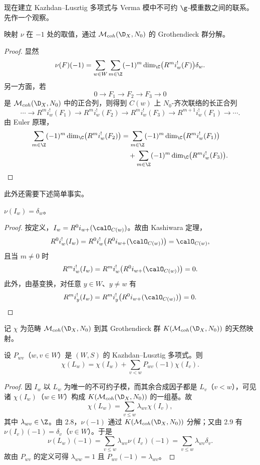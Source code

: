 现在建立 Kazhdan--Lusztig 多项式与 Verma 模中不可约 $\g$-模重数之间的联系。先作一个观察。

\begin{lemma}\label{lem:05.2.8}
映射 $\nu$ 在 $-1$ 处的取值，通过 $\mathcal{M}_{coh}(\D_X,N_0)$ 的 Grothendieck 群分解。
\end{lemma}

\begin{proof}
显然
$$\nu(F)(-1)=\sum_{w\in W}\sum_{m\in\Z}(-1)^m\dim_\C\bigl(R^mi^!_w(F)\bigr)\delta_w.$$
另一方面，若
$$0\longrightarrow F_1\longrightarrow F_2\longrightarrow F_3\longrightarrow 0$$
是 $\mathcal{M}_{coh}(\D_X,N_0)$ 中的正合列，则得到 $C(w)$ 上 $N_0$-齐次联络的长正合列
$$\cdots\to R^mi^!_w(F_1)\to R^mi^!_w(F_2)\to R^mi^!_w(F_3)\to R^{m+1}i^!_w(F_1)\to\cdots.$$
由 Euler 原理，
\begin{align*}
\sum_{m\in\Z}(-1)^m\dim_\C\bigl(R^mi^!_w(F_2)\bigr)
&=\sum_{m\in\Z}(-1)^m\dim_\C\bigl(R^mi^!_w(F_1)\bigr)\\
&\quad+\sum_{m\in\Z}(-1)^m\dim_\C\bigl(R^mi^!_w(F_3)\bigr).
\end{align*}
\end{proof}

此外还需要下述简单事实。

\begin{lemma}\label{lem:05.2.9}
$\nu(I_w)=\delta_w$。
\end{lemma}

\begin{proof}
按定义，$I_w=R^0i_{w+}(\calO_{C(w)})$。故由 Kashiwara 定理，
$$R^0i^!_w(I_w)=R^0i^!_w\bigl(R^0i_{w+}(\calO_{C(w)})\bigr)=\calO_{C(w)},$$
且当 $m\neq 0$ 时
$$R^mi^!_w(I_w)=R^mi^!_w\bigl(R^0i_{w+}(\calO_{C(w)})\bigr)=0.$$
此外，由基变换，对任意 $y\in W$、$y\neq w$ 有
$$R^mi^!_y(I_w)=R^mi^!_y\bigl(R^0i_{w+}(\calO_{C(w)})\bigr)=0.$$
\end{proof}

记 $\chi$ 为范畴 $\mathcal{M}_{coh}(\D_X,N_0)$ 到其 Grothendieck 群 $K(\mathcal{M}_{coh}(\D_X,N_0))$ 的天然映射。

\begin{theorem}\label{thm:05.2.10}
设 $P_{wv}$（$w,v\in W$）是 $(W,S)$ 的 Kazhdan--Lusztig 多项式。则
$$\chi(L_w)=\chi(I_w)+\sum_{v<w}P_{wv}(-1)\chi(I_v).$$
\end{theorem}

\begin{proof}
因 $I_w$ 以 $L_w$ 为唯一的不可约子模，而其余合成因子都是 $L_v$（$v<w$），可见诸 $\chi(I_w)$（$w\in W$）构成 $K(\mathcal{M}_{coh}(\D_X,N_0))$ 的一组基。故
$$\chi(L_w)=\sum_{v\leq w}\lambda_{wv}\chi(I_v),$$
其中 $\lambda_{wv}\in\Z$。由 2.8，$\nu(-1)$ 通过 $K(\mathcal{M}_{coh}(\D_X,N_0))$ 分解；又由 2.9 有 $\nu(I_v)(-1)=\delta_v$（$v\in W$）。于是
$$\nu(L_w)(-1)=\sum_{v\leq w}\lambda_{wv}\nu(I_v)(-1)=\sum_{v\leq w}\lambda_{wv}\delta_v.$$
故由 $P_{wv}$ 的定义可得 $\lambda_{ww}=1$ 且 $P_{wv}(-1)=\lambda_{wv}$。
\end{proof}

